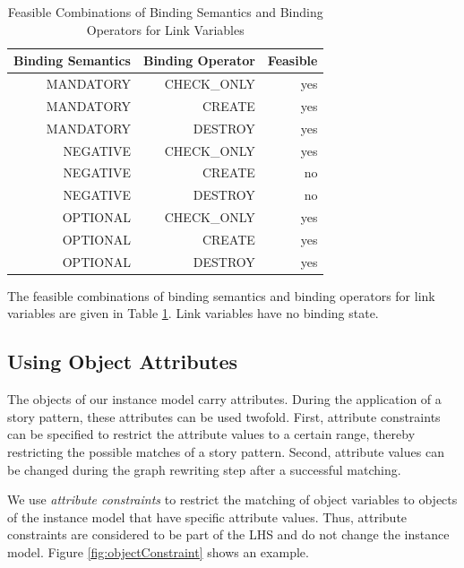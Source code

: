 

\begin{table}[htbp]
  \centering
  \caption{Feasible Combinations of Binding Semantics and
  Binding Operators for Link Variables}
    \begin{tabular}{|r|r|r|}
    \hline
    \textbf{Binding Semantics} & \textbf{Binding
    Operator} & \textbf{Feasible} \\
    \hline
    MANDATORY & CHECK\_ONLY & yes \\
    MANDATORY & CREATE & yes \\
    MANDATORY & DESTROY & yes \\
    NEGATIVE & CHECK\_ONLY & yes \\
    NEGATIVE & CREATE & no \\
    NEGATIVE & DESTROY & no \\
    OPTIONAL & CHECK\_ONLY & yes \\
    OPTIONAL & CREATE & yes \\
    OPTIONAL & DESTROY & yes \\
    \hline
    \end{tabular}%
  \label{tab:bindingCombinations_links}%
\end{table}%

The feasible combinations of binding semantics and binding operators for link
variables are given in Table \ref{tab:bindingCombinations_links}. Link variables
have no binding state.


\subsection{Using Object Attributes}
\label{sec:StoryPatterns:attributes}

The objects of our instance model carry attributes. 
During the application of a story pattern, these attributes can be used twofold. 
First, attribute constraints can be specified to restrict the attribute values to a certain range, thereby restricting the possible matches of a story pattern. 
Second, attribute values can be changed during the graph rewriting step after a successful matching.

We use \emph{attribute constraints} to restrict the matching of object variables to objects of the instance model that have specific attribute values. 
Thus, attribute constraints are considered to be part of the LHS and do not change the instance model. 
Figure \ref{fig:objectConstraint} shows an example.

